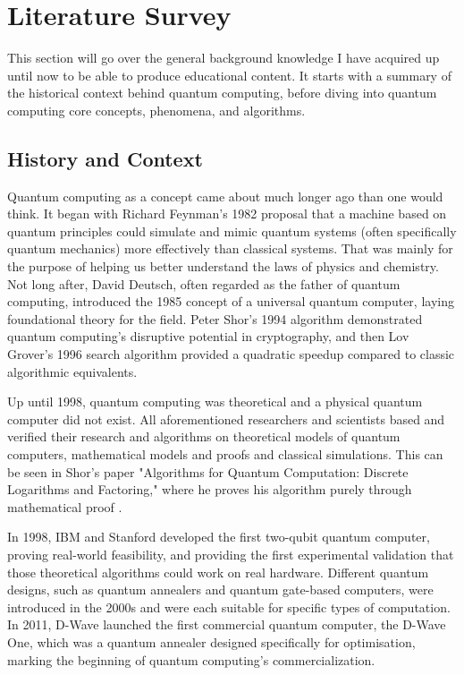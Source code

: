 \chapter{Literature Survey}


This section will go over the general background knowledge I have acquired up until now to be able to produce educational content. It starts with a summary of the historical context behind quantum computing, before diving into quantum computing core concepts, phenomena, and algorithms.  

\section{ History and Context }

Quantum computing as a concept came about much longer ago than one would think. It began with Richard Feynman’s 1982 proposal that a machine based on quantum principles could simulate and mimic quantum systems (often specifically quantum mechanics) more effectively than classical systems\cite{Refrence2}. That was mainly for the purpose of helping us better understand the laws of physics and chemistry. Not long after, David Deutsch, often regarded as the father of quantum computing, introduced the 1985 concept of a universal quantum computer, laying foundational theory for the field. Peter Shor's 1994 algorithm demonstrated quantum computing's disruptive potential in cryptography, and then Lov Grover’s 1996 search algorithm provided a quadratic speedup compared to classic algorithmic equivalents.\newline

Up until 1998, quantum computing was theoretical and a physical quantum computer did not exist. All aforementioned researchers and scientists based and verified their research and algorithms on theoretical models of quantum computers, mathematical models and proofs and classical simulations.  This can be seen in Shor's paper "Algorithms for Quantum Computation: Discrete Logarithms and Factoring," where he proves his algorithm purely through mathematical proof \cite{Reference3}. \newline

In 1998, IBM and Stanford developed the first two-qubit quantum computer, proving real-world feasibility, and  providing the first experimental validation that those theoretical algorithms could work on real hardware. Different quantum designs, such as quantum annealers and quantum gate-based computers, were introduced in the 2000s and were each suitable for specific types of computation. In 2011, D-Wave launched the first commercial quantum computer, the D-Wave One, which was a quantum annealer designed specifically for optimisation, marking the beginning of quantum computing's commercialization. \newline 

